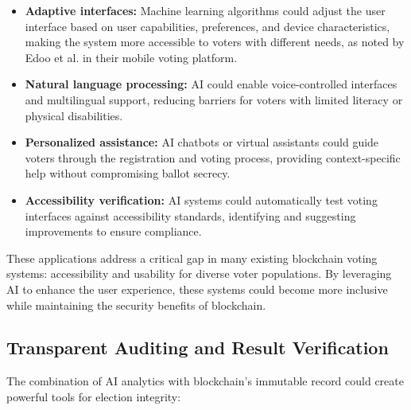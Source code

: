 \documentclass[conference]{IEEEtran}
\begin{document}
\begin{itemize}
    \item \textbf{Adaptive interfaces:} Machine learning algorithms could adjust the user interface based on user capabilities, preferences, and device characteristics, making the system more accessible to voters with different needs, as noted by Edoo et al. \cite{b7} in their mobile voting platform.
    
    \item \textbf{Natural language processing:} AI could enable voice-controlled interfaces and multilingual support, reducing barriers for voters with limited literacy or physical disabilities.
    
    \item \textbf{Personalized assistance:} AI chatbots or virtual assistants could guide voters through the registration and voting process, providing context-specific help without compromising ballot secrecy.
    
    \item \textbf{Accessibility verification:} AI systems could automatically test voting interfaces against accessibility standards, identifying and suggesting improvements to ensure compliance.
\end{itemize}

These applications address a critical gap in many existing blockchain voting systems: accessibility and usability for diverse voter populations. By leveraging AI to enhance the user experience, these systems could become more inclusive while maintaining the security benefits of blockchain.

\subsection{Transparent Auditing and Result Verification}
The combination of AI analytics with blockchain's immutable record could create powerful tools for election integrity:
\end{document}
